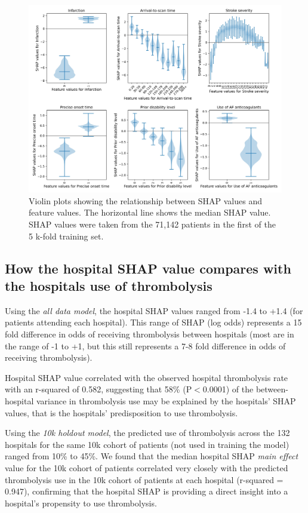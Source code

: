 \begin{figure}[!h]
\centering
\includegraphics[width=1\textwidth]{./images/03_xgb_10_features_thrombolysis_shap_violin}
\caption{Violin plots showing the relationship between SHAP values and feature values. The horizontal line shows the median SHAP value. SHAP values were taken from the 71,142 patients in the first of the 5 k-fold training set.}
\label{fig:results_shap_violin}
\end{figure}


\subsection{How the hospital SHAP value compares with the hospitals use of thrombolysis}

Using the \emph{all data model}, the hospital SHAP values ranged from -1.4 to +1.4 (for patients attending each hospital). This range of SHAP (log odds) represents a 15 fold difference in odds of receiving thrombolysis between hospitals (most are in the range of -1 to +1, but this still represents a 7-8 fold difference in odds of receiving thrombolysis).

Hospital SHAP value correlated with the observed hospital thrombolysis rate with an r-squared of 0.582, suggesting that 58\% (P$<$0.0001) of the between-hospital variance in thrombolysis use may be explained by the hospitals' SHAP values, that is the hospitals' predisposition to use thrombolysis.

Using the \emph{10k holdout model}, the predicted use of thrombolysis across the 132 hospitals for the same 10k cohort of patients (not used in training the model) ranged from 10\% to 45\%. We found that the median hospital SHAP \emph{main effect} value for the 10k cohort of patients correlated very closely with the predicted thrombolysis use in the 10k cohort of patients at each hospital (r-squared = 0.947), confirming that the hospital SHAP is providing a direct insight into a hospital's propensity to use thrombolysis.

